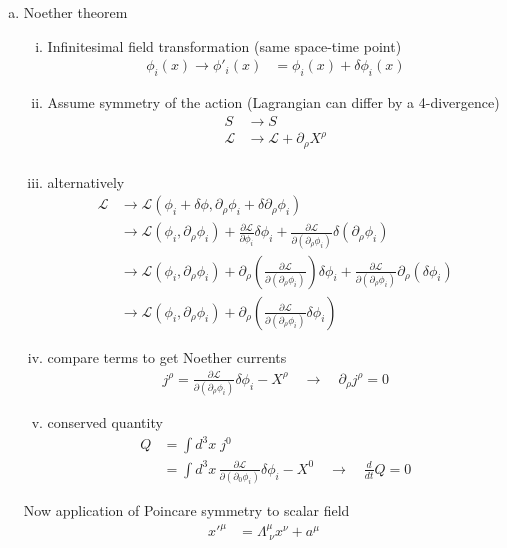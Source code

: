 \documentclass[10pt,a4paper]{report}
\theoremstyle{definition}
\begin{document}
\begin{enumerate}[a)]
\item
Noether theorem
\begin{enumerate}[(i)]
\item Infinitesimal field transformation (same space-time point)
\begin{align}
\phi_i(x)\rightarrow\phi'_i(x)&=\phi_i(x)+\delta\phi_i(x)
\end{align}
\item Assume symmetry of the action (Lagrangian can differ by a 4-divergence)
\begin{align}
S&\rightarrow S\\
\mathcal{L}&\rightarrow\mathcal{L}+\partial_\rho X^\rho\\
\end{align}
\item alternatively
\begin{align}
\mathcal{L}
&\rightarrow\mathcal{L}(\phi_i+\delta\phi,\partial_\rho\phi_i+\delta\partial_\rho\phi_i)\\
&\rightarrow\mathcal{L}(\phi_i,\partial_\rho\phi_i)
+\frac{\partial\mathcal{L}}{\partial\phi_i}\delta\phi_i
+\frac{\partial\mathcal{L}}{\partial(\partial_\rho\phi_i)}\delta(\partial_\rho\phi_i)\\
&\rightarrow\mathcal{L}(\phi_i,\partial_\rho\phi_i)
+\partial_\rho
\left(\frac{\partial\mathcal{L}}{\partial(\partial_\rho\phi_i)}\right)\delta\phi_i
+\frac{\partial\mathcal{L}}{\partial(\partial_\rho\phi_i)}\partial_\rho(\delta\phi_i)\\
&\rightarrow\mathcal{L}(\phi_i,\partial_\rho\phi_i)
+\partial_\rho
\left(\frac{\partial\mathcal{L}}{\partial(\partial_\rho\phi_i)}\delta\phi_i\right)
\end{align}
\item compare terms to get Noether currents 
\begin{align}
j^\rho
=\frac{\partial\mathcal{L}}{\partial(\partial_\rho\phi_i)}\delta\phi_i-X^\rho
\quad\rightarrow\quad
\partial_\rho j^\rho=0
\end{align}
\item conserved quantity
\begin{align}
Q
&=\int d^3x\; j^0\\
&=\int d^3x\,\frac{\partial\mathcal{L}}{\partial(\partial_0\phi_i)}\delta\phi_i-X^0\quad\rightarrow\quad\frac{d}{dt}Q=0
\end{align}
\end{enumerate}
Now application of Poincare symmetry to scalar field
\begin{align}
x'^\mu&=\Lambda^\mu_{\;\nu} x^\nu+a^\mu\\

\end{align}
\end{enumerate}
\end{document}
